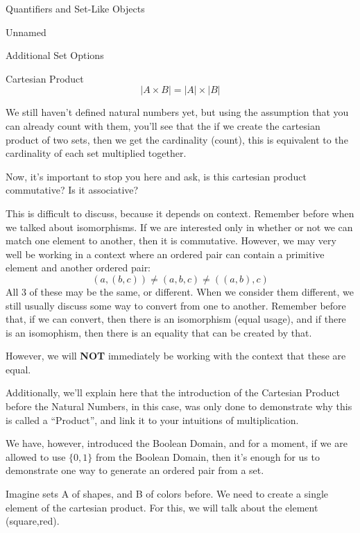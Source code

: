 \begin{part}{Quantifiers and Set-Like Objects}
\begin{chapter}{Unnamed}
\begin{section}{Additional Set Options}
\begin{subsection}{Cartesian Product}
                \begin{equation}
                    |A \times B| = |A| \times |B|
                \end{equation}
                
                We still haven't defined natural numbers yet, but using the assumption that you can already count with them, you'll see that the if we create the cartesian product of two sets, then we get the cardinality (count), this is equivalent to the cardinality of each set multiplied together.
                
                Now, it's important to stop you here and ask, is this cartesian product commutative? Is it associative?
                
                This is difficult to discuss, because it depends on context. Remember before when we talked about isomorphisms. If we are interested only in whether or not we can match one element to another, then it is commutative. However, we may very well be working in a context where an ordered pair can contain a primitive element and another ordered pair:
                $$
                    (a, (b, c)) \neq  (a, b, c) \neq ((a, b), c)
                $$
                All 3 of these may be the same, or different. When we consider them different, we still usually discuss some way to convert from one to another. Remember before that, if we can convert, then there is an isomorphism (equal usage), and if there is an isomophism, then there is an equality that can be created by that.
                
                However, we will \textbf{NOT} immediately be working with the context that these are equal.
                
                Additionally, we'll explain here that the introduction of the Cartesian Product before the Natural Numbers, in this case, was only done to demonstrate why this is called a ``Product'', and link it to your intuitions of multiplication.
                
                We have, however, introduced the Boolean Domain, and for a moment, if we are allowed to use $\{0, 1\}$ from the Boolean Domain, then it's enough for us to demonstrate one way to generate an ordered pair from a set.
                
                Imagine sets A of shapes, and B of colors before. We need to create a single element of the cartesian product. For this, we will talk about the element (square,red).
                

\end{subsection}
\end{section}
\end{chapter}
\end{part}
